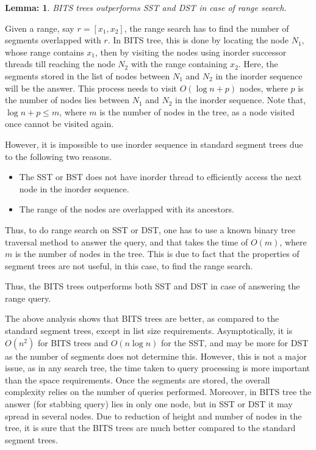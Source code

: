 \documentclass{article}
\newtheorem{lemma}{Lemma:}
\newenvironment{proof}{{\bf Proof:}}{\hfill {\fbox{}}}
\begin{document}
\par
\begin{lemma}
BITS trees outperforms SST and DST in case of range search.
\end{lemma}
\begin{proof}
Given a range, say $r=[x_1,x_2]$, the range search has to find the number of segments overlapped with $r$. In BITS tree, this is done by locating the node $N_1$, whose range contains $x_1$, then by visiting the nodes using inorder successor threads till reaching the node $N_2$ with the range containing $x_2$. Here, the segments stored in the list of nodes between $N_1$ and $N_2$ in the inorder sequence will be the answer. This process needs to visit $O(\log n +p)$ nodes, where $p$ is the number of nodes lies between $N_1$ and $N_2$ in the inorder sequence. Note that, $\log n+p \le m$, where $m$ is the number of nodes in the tree, as a node visited once cannot be visited again. 
\par
However, it is impossible to use inorder sequence in standard segment trees due to the following two reasons.
\begin{itemize}
	\item The SST or BST does not have inorder thread to efficiently access the next node in the inorder sequence.
	\item The range of the nodes are overlapped with its ancestors.
\end{itemize}
Thus, to do range search on SST or DST, one has to use a known binary tree traversal method to answer the query, and that takes the time of $O(m)$, where $m$ is the number of nodes in the tree. This is due to fact that the properties of segment trees are not useful, in this case, to find the range search. 
\par
Thus, the BITS trees outperforms both SST and DST in case of answering the range query.
\end{proof}
\par
The above analysis shows that BITS trees are better, as compared to the standard segment trees, except in list size requirements. Asymptotically, it is $O(n^2)$ for BITS trees and $O(n\log n)$ for the SST, and may be more for DST as the number of segments does not determine this. However, this is not a major issue, as in any search tree, the time taken to query processing is more important than the space requirements. Once the segments are stored, the overall complexity relies on the number of queries performed. Moreover, in BITS tree the answer (for stabbing query) lies in only one node, but in SST or DST it may spread in several nodes. Due to reduction of height and number of nodes in the tree, it is sure that the BITS trees are much better compared to the standard segment trees. 
\end{document}
